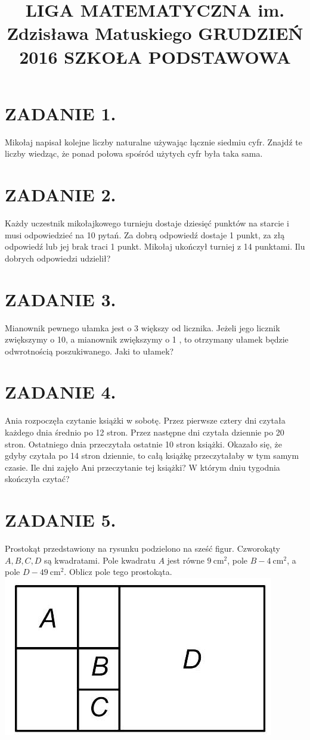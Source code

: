 \documentclass[10pt]{article}
\title{LIGA MATEMATYCZNA im. Zdzisława Matuskiego GRUDZIEŃ 2016 SZKOŁA PODSTAWOWA }
\author{}
\date{}
\begin{document}
\maketitle
\section*{ZADANIE 1.}
Mikołaj napisał kolejne liczby naturalne używając łącznie siedmiu cyfr. Znajdź te liczby wiedząc, że ponad połowa spośród użytych cyfr była taka sama.

\section*{ZADANIE 2.}
Każdy uczestnik mikołajkowego turnieju dostaje dziesięć punktów na starcie i musi odpowiedzieć na 10 pytań. Za dobrą odpowiedź dostaje 1 punkt, za złą odpowiedź lub jej brak traci 1 punkt. Mikołaj ukończył turniej z 14 punktami. Ilu dobrych odpowiedzi udzielił?

\section*{ZADANIE 3.}
Mianownik pewnego ułamka jest o 3 większy od licznika. Jeżeli jego licznik zwiększymy o 10, a mianownik zwiększymy o 1 , to otrzymany ułamek będzie odwrotnością poszukiwanego. Jaki to ułamek?

\section*{ZADANIE 4.}
Ania rozpoczęła czytanie książki w sobotę. Przez pierwsze cztery dni czytała każdego dnia średnio po 12 stron. Przez następne dni czytała dziennie po 20 stron. Ostatniego dnia przeczytała ostatnie 10 stron książki. Okazało się, że gdyby czytała po 14 stron dziennie, to całą książkę przeczytałaby w tym samym czasie. Ile dni zajęło Ani przeczytanie tej książki? W którym dniu tygodnia skończyła czytać?

\section*{ZADANIE 5.}
Prostokąt przedstawiony na rysunku podzielono na sześć figur. Czworokąty \(A, B, C, D\) są kwadratami. Pole kwadratu \(A\) jest równe \(9 \mathrm{~cm}^{2}\), pole \(B-4 \mathrm{~cm}^{2}\), a pole \(D-49 \mathrm{~cm}^{2}\). Oblicz pole tego prostokąta.\\
\includegraphics[max width=\textwidth, center]{2024_11_21_175fed1d19e2e2068a8dg-1}
\end{document}
